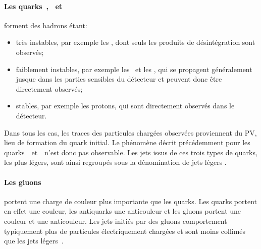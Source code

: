 \paragraph{Les quarks~\quarkd, \quarku\ et~\quarks} forment des hadrons étant:
\begin{itemize}
\item très instables, par exemple les \pionnull, dont seuls les produits de désintégration sont observés;
\item faiblement instables, par exemple les \Kaonplus\ et les \Kaonnull, qui se propagent généralement jusque dans les parties sensibles du détecteur et peuvent donc être directement observés;
\item stables, par exemple les protons, qui sont directement observés dans le détecteur.
\end{itemize}
Dans tous les cas, les traces des particules chargées observées proviennent du PV, lieu de formation du quark initial.
Le phénomène décrit précédemment pour les quarks~\quarkb\ et~\quarkc\ n'est donc pas observable.
Les jets issus de ces trois types de quarks, les plus légers, sont ainsi regroupés sous la dénomination de \og jets légers \fg.
\paragraph{Les gluons} portent une charge de couleur plus importante que les quarks.
Les quarks portent en effet une couleur, les antiquarks une anticouleur et les gluons portent une couleur et une anticouleur.
Les jets initiés par des gluons comportement typiquement plus de particules électriquement chargées et sont moins collimés que les jets légers~\cite{CMS-PAS-JME-13-002}.